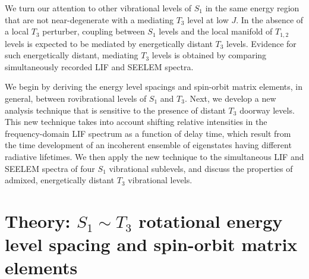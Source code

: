 \documentclass[12pt]{mitthesis}
\begin{document}
We turn our attention to other vibrational levels of $S_1$ in the same
energy region that are not near-degenerate with a mediating $T_3$
level at low $J$.  In the absence of a local $T_3$ perturber, coupling
between $S_1$ levels and the local manifold of $T_{1,2}$ levels is
expected to be mediated by energetically distant $T_3$ levels.
Evidence for such energetically distant, mediating $T_3$ levels is
obtained by comparing simultaneously recorded LIF and SEELEM spectra.

We begin by deriving the energy level spacings and spin-orbit matrix
elements, in general, between rovibrational levels of $S_1$ and $T_3$.
Next, we develop a new analysis technique that is sensitive to the
presence of distant $T_3$ doorway levels.  This new technique takes
into account shifting relative intensities in the frequency-domain LIF
spectrum as a function of delay time, which result from the time
development of an incoherent ensemble of eigenstates having different
radiative lifetimes.  We then apply the new technique to the
simultaneous LIF and SEELEM spectra of four $S_1$ vibrational
sublevels, and discuss the properties of admixed, energetically
distant $T_3$ vibrational levels.

\section{Theory: $S_1 \sim T_3$ rotational energy level spacing and
  spin-orbit matrix elements}
\label{theory1}
\end{document}
